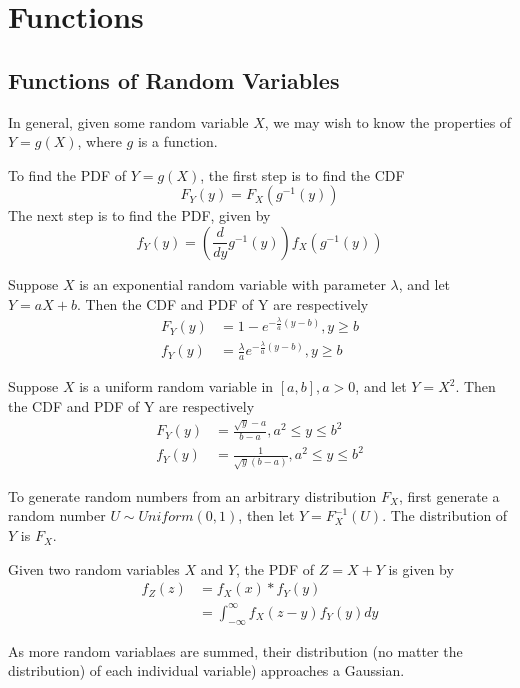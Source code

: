 \section{Functions}

\subsection{Functions of Random Variables}
In general, given some random variable
$X$, we may wish to know the properties
of $Y = g(X)$, where $g$ is a function.

To find the PDF of $Y = g(X)$, the first
step is to find the CDF
\begin{equation}
    F_Y(y) = F_X(g^{-1}(y))
\end{equation}
The next step is to find the PDF, given by
\begin{equation}
    f_Y(y) = \left(\frac{d}{dy}g^{-1}(y)\right)f_X(g^{-1}(y))
\end{equation}

Suppose $X$ is an exponential random variable
with parameter $\lambda$, and let $Y  = aX + b$.
Then the CDF and PDF of Y are respectively
\begin{align}
    F_Y(y) & = 1 - e^{-\frac{\lambda}{a}(y - b)}, y \geq b              \\
    f_Y(y) & = \frac{\lambda}{a}e^{-\frac{\lambda}{a}(y - b)}, y \geq b
\end{align}

Suppose $X$ is a uniform random variable in $\left[a, b\right], a > 0$,
and let $Y = X^2$. Then the CDF and PDF of Y are respectively
\begin{align}
    F_Y(y) & = \frac{\sqrt{y} - a}{b - a}, a^2 \leq y \leq b^2 \\
    f_Y(y) & = \frac{1}{\sqrt{y}(b - a)}, a^2 \leq y \leq b^2
\end{align}

To generate random numbers from an arbitrary
distribution $F_X$, first generate a random
number $U \sim Uniform(0,1)$, then let
$Y = F^{-1}_X(U)$. The distribution of $Y$ is
$F_X$.

Given two random variables $X$ and $Y$, the
PDF of $Z = X + Y$ is given by
\begin{align}
    f_Z(z) & = f_X(x) * f_Y(y)                          \\
           & = \int_{-\infty}^{\infty} f_X(z-y)f_Y(y)dy
\end{align}

As more random variablaes are summed, their
distribution (no matter the distribution) of each
individual variable) approaches a Gaussian.

